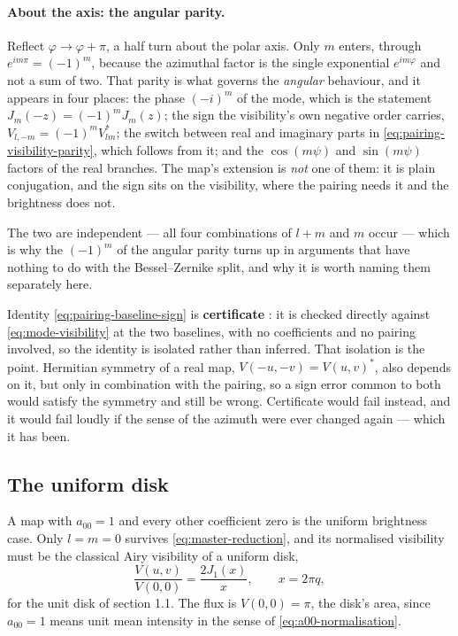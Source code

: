 \paragraph{About the axis: the angular parity.}  Reflect $\varphi \to \varphi + \pi$, a half
turn about the polar axis.  Only $m$ enters, through $e^{im\pi} = (-1)^m$, because the azimuthal
factor is the single exponential $e^{im\varphi}$ and not a sum of two.  That parity is what
governs the \emph{angular} behaviour, and it appears in four places: the phase $(-i)^m$ of the
mode, which is the statement $J_m(-z) = (-1)^mJ_m(z)$; the sign the visibility's own negative
order carries, $V_{l,-m} = (-1)^mV_{lm}^*$; the switch between real and imaginary parts
in \eqref{eq:pairing-visibility-parity}, which follows from it; and the $\cos(m\psi)$ and
$\sin(m\psi)$ factors of the real branches.  The map's extension is \emph{not} one of them: it is
plain conjugation, and the sign sits on the visibility, where the pairing needs it and the
brightness does not.

The two are independent --- all four combinations of $l+m$ and $m$ occur --- which is why the
$(-1)^m$ of the angular parity turns up in arguments that have nothing to do with the
Bessel--Zernike split, and why it is worth naming them separately here.

Identity \eqref{eq:pairing-baseline-sign} is \textbf{certificate }: it is checked
directly against \eqref{eq:mode-visibility} at the two baselines, with no coefficients and no
pairing involved, so the identity is isolated rather than inferred.  That isolation is the
point.  Hermitian symmetry of a real map, $V(-u,-v) = V(u,v)^*$, also depends on it,
but only in combination with the pairing, so a sign error common to both would satisfy the
symmetry and still be wrong.  Certificate  would fail instead, and it would fail
loudly if the sense of the azimuth were ever changed again --- which it has been.

\subsection{The uniform disk}
\label{sec:uniform-disk}

A map with $a_{00} = 1$ and every other coefficient zero is the uniform brightness
case.  Only $l = m = 0$ survives \eqref{eq:master-reduction}, and its normalised
visibility must be the classical Airy visibility of a uniform disk,
\begin{equation}
  \frac{V(u,v)}{V(0,0)} = \frac{2J_1(x)}{x} , \qquad x = 2\pi q ,
  \label{eq:uniform-disk}
\end{equation}
for the unit disk of section 1.1.  The flux is $V(0,0) = \pi$, the disk's area, since
$a_{00} = 1$ means unit mean intensity in the sense of
\eqref{eq:a00-normalisation}.

